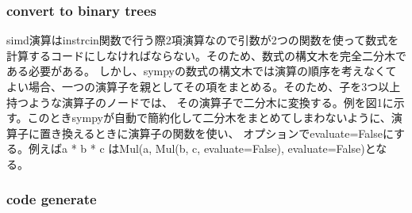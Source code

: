 \documentclass{jarticle}
\begin{document}
\subsubsection{convert to binary trees}
simd演算はinstrcin関数で行う際2項演算なので引数が2つの関数を使って数式を計算するコードにしなければならない。そのため、数式の構文木を完全二分木である必要がある。
しかし、sympyの数式の構文木では演算の順序を考えなくてよい場合、一つの演算子を親としてその項をまとめる。そのため、子を3つ以上持つような演算子のノードでは、
その演算子で二分木に変換する。例を図1に示す。このときsympyが自動で簡約化して二分木をまとめてしまわないように、演算子に置き換えるときに演算子の関数を使い、
オプションでevaluate=Falseにする。例えばa * b * c はMul(a, Mul(b, c, evaluate=False), evaluate=False)となる。


\subsubsection{code generate}
\end{document}
